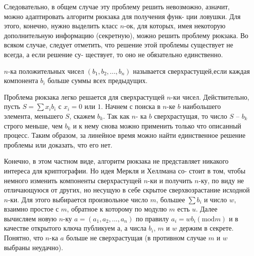 \documentclass{../template/mai_book}
\begin{document}
Следовательно, в общем случае эту проблему решить невозможно, а\linebreak значит, можно адаптировать алгоритм рюкзака для получения функ-\linebreak
­ции ловушки. Для этого, конечно, нужно выделить класс $n$-ок, для\linebreak
которых, имея некоторую дополнительную информацию (секретную),\linebreak
можно решить проблему рюкзака. Во всяком случае, следует отметить,\linebreak
что решение этой проблемы существует не всегда, а если решение су-\linebreak
ществует, то оно не обязательно единственно.
\begin{determ}
$n$-ка положительных чисел $(b_1,b_2,...,b_n)$ называется сверхрастущей,\linebreak если каждая компонента $b_i$ больше суммы всех предыдущих.
\end{determ}
Проблема рюкзака легко решается для сверхрастущей $n$-ки чисел.\linebreak
Действительно, пусть $S = \sum x_i b_i$ с $x_i = 0$ или $1$. Начнем с поиска\linebreak
\noindent в $n$-ке $b$ наибольшего элемента, меньшего $S$, скажем $b_k$. Так как $n$-\linebreak
ка $b$ сверхрастущая, то число $S\text{ -- }b_k$ строго меньше, чем $b_k$ и к нему\linebreak
снова можно применить только что описанный процесс. Таким образом,\linebreak
за линейное время можно найти единственное решение проблемы или\linebreak
доказать, что его нет.

Конечно, в этом частном виде, алгоритм рюкзака не представляет\linebreak
никакого интереса для криптографии. Но идея Меркля и Хеллмана со­-\linebreak
стоит в том, чтобы немного изменить компоненты сверхрастущей $n$-ки\linebreak
и получить $n$-ку, по виду не отличающуюся от других, но несущую в\linebreak
себе скрытое сверхвозрастание исходной $n$-ки. Для этого выбирается\linebreak
произвольное число $m$, большее $\sum b_i$ и число $w$, взаимно простое с $m$,\linebreak
обратное к которому по модулю $m$ есть $u$. Далее вычисляем новую $n$-ку\linebreak
$a = (a_1,a_2,...,a_n)$ по правилу $a_i = wb_i (\text{mod} m)$ и в качестве открытого\linebreak
ключа публикуем $а$, а числа $b_i$, $m$ и $w$ держим в секрете. Понятно, что\linebreak
$n$-ка $a$ больше не сверхрастущая (в противном случае $m$ и $w$ выбраны\linebreak
неудачно).
\end{document}
